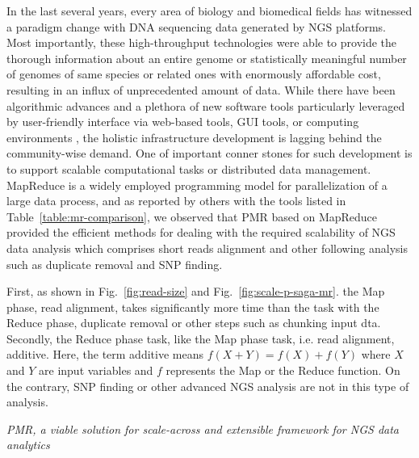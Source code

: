 \documentclass{acm_proc_article-sp}
\begin{document}
In the last several years, every area of biology and biomedical fields
has witnessed a paradigm change with DNA sequencing data generated by
NGS
platforms\cite{metzker2010,1000genome,wang2009-natrevgen,alex2009,mcpherson2009}.
Most importantly, these high-throughput technologies were able to
provide the thorough information about an entire genome or
statistically meaningful number of genomes of same species or related
ones with enormously affordable cost, resulting in an influx of
unprecedented amount of data.  While there have been algorithmic
advances and a plethora of new software tools particularly leveraged
by user-friendly interface via web-based tools, GUI tools, or computing environments \cite{galaxy}, the holistic infrastructure
development is lagging behind the community-wise demand.  One of
important conner stones for such development is to support scalable
computational tasks or distributed data management.  MapReduce is a
widely employed programming model for parallelization of a large data
process, and as reported by others with the tools listed in
Table~\ref{table:mr-comparison}, we observed that PMR based on
MapReduce provided the efficient methods for dealing with the required
scalability of NGS data analysis which comprises short reads alignment
and other following analysis such as duplicate removal and SNP
finding.

First, as shown in  Fig.~\ref{fig:read-size} and Fig.~\ref{fig:scale-p-saga-mr}. the Map phase, read alignment, takes significantly more time than the task with the Reduce phase, duplicate removal or other steps such as chunking input dta.  Secondly, the Reduce phase task, like the Map phase task, i.e. read alignment, additive.  Here, the term additive means $f(X + Y) = f(X) + f(Y)$ where $X$ and $Y$ are input variables and $f$ represents the Map or the Reduce function.  On the contrary, SNP finding or other advanced NGS analysis are not in this type of analysis.   


\textit{PMR, a viable solution for scale-across and extensible framework for NGS data analytics}
\end{document}
